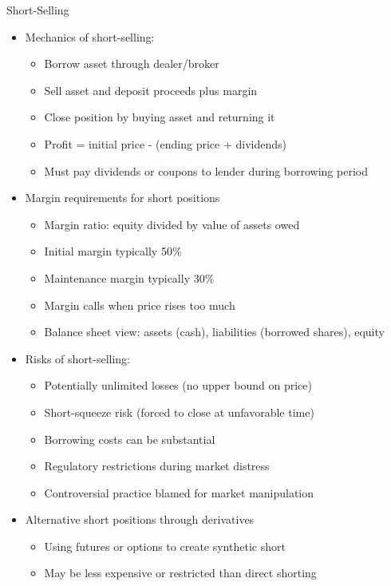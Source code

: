 \documentclass[10pt]{beamer}
\begin{document}
\begin{frame}{Short-Selling}
  \begin{itemize}[<+->]
    \item Mechanics of short-selling:
      \begin{itemize}
        \item Borrow asset through dealer/broker
        \item Sell asset and deposit proceeds plus margin
        \item Close position by buying asset and returning it
        \item Profit = initial price - (ending price + dividends)
        \item Must pay dividends or coupons to lender during borrowing period
      \end{itemize}
    \item Margin requirements for short positions
      \begin{itemize}
        \item Margin ratio: equity divided by value of assets owed
        \item Initial margin typically 50\%
        \item Maintenance margin typically 30\%
        \item Margin calls when price rises too much
        \item Balance sheet view: assets (cash), liabilities (borrowed shares), equity
      \end{itemize}
    \item Risks of short-selling:
      \begin{itemize}
        \item Potentially unlimited losses (no upper bound on price)
        \item Short-squeeze risk (forced to close at unfavorable time)
        \item Borrowing costs can be substantial
        \item Regulatory restrictions during market distress
        \item Controversial practice blamed for market manipulation
      \end{itemize}
    \item Alternative short positions through derivatives
      \begin{itemize}
        \item Using futures or options to create synthetic short
        \item May be less expensive or restricted than direct shorting
      \end{itemize}
  \end{itemize}
\end{frame}
\end{document}
